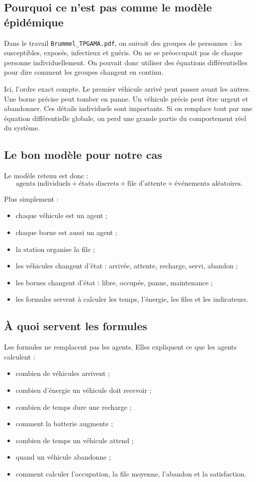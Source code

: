 \documentclass[11pt]{article}
\begin{document}
\subsection{Pourquoi ce n'est pas comme le modèle épidémique}

Dans le travail \texttt{Brummel\_TPGAMA.pdf}, on suivait des groupes de personnes : les susceptibles, exposés, infectieux et guéris. On ne se préoccupait pas de chaque personne individuellement. On pouvait donc utiliser des équations différentielles pour dire comment les groupes changent en continu.

Ici, l'ordre exact compte. Le premier véhicule arrivé peut passer avant les autres. Une borne précise peut tomber en panne. Un véhicule précis peut être urgent et abandonner. Ces détails individuels sont importants. Si on remplace tout par une équation différentielle globale, on perd une grande partie du comportement réel du système.

\subsection{Le bon modèle pour notre cas}

Le modèle retenu est donc :
\[
\text{agents individuels} + \text{états discrets} + \text{file d'attente} + \text{événements aléatoires}.
\]

Plus simplement :
\begin{itemize}
  \item chaque véhicule est un agent ;
  \item chaque borne est aussi un agent ;
  \item la station organise la file ;
  \item les véhicules changent d'état : arrivée, attente, recharge, servi, abandon ;
  \item les bornes changent d'état : libre, occupée, panne, maintenance ;
  \item les formules servent à calculer les temps, l'énergie, les files et les indicateurs.
\end{itemize}

\subsection{À quoi servent les formules}

Les formules ne remplacent pas les agents. Elles expliquent ce que les agents calculent :
\begin{itemize}
  \item combien de véhicules arrivent ;
  \item combien d'énergie un véhicule doit recevoir ;
  \item combien de temps dure une recharge ;
  \item comment la batterie augmente ;
  \item combien de temps un véhicule attend ;
  \item quand un véhicule abandonne ;
  \item comment calculer l'occupation, la file moyenne, l'abandon et la satisfaction.
\end{itemize}
\end{document}
